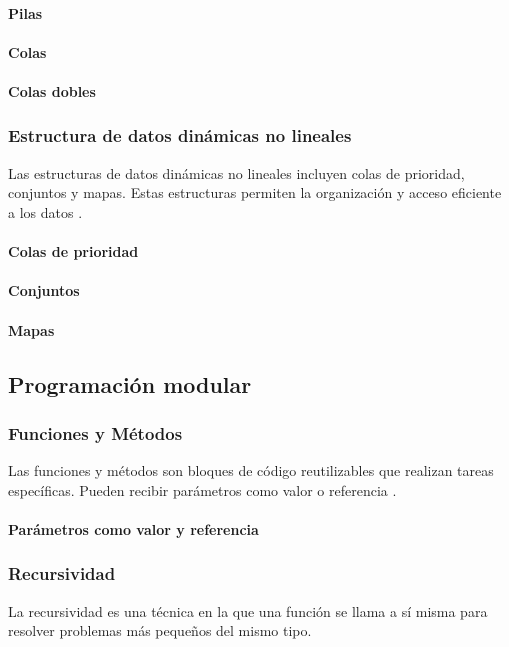 \paragraph{Pilas}
\paragraph{Colas}
\paragraph{Colas dobles}

\subsubsection{Estructura de datos dinámicas no lineales}
Las estructuras de datos dinámicas no lineales incluyen colas de prioridad, conjuntos y mapas. Estas estructuras permiten la organización y acceso eficiente a los datos \cite{stroustrup2013c++}.
\paragraph{Colas de prioridad}
\paragraph{Conjuntos}
\paragraph{Mapas}

\subsection{Programación modular}
\subsubsection{Funciones y Métodos}
Las funciones y métodos son bloques de código reutilizables que realizan tareas específicas. Pueden recibir parámetros como valor o referencia \cite{stroustrup2013c++}.
\paragraph{Parámetros como valor y referencia}
\subsubsection{Recursividad}
La recursividad es una técnica en la que una función se llama a sí misma para resolver problemas más pequeños del mismo tipo.

